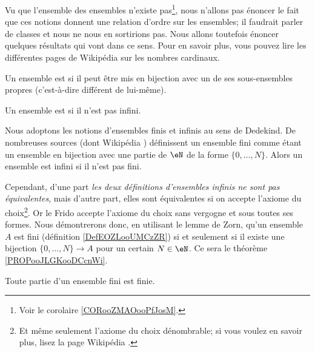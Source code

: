 \begin{normaltext}\label{NORooPasDeClasses}
	Vu que l'ensemble des ensembles n'existe pas\footnote{Voir le corolaire \ref{CORooZMAOooPfJosM}.}, nous n'allons pas énoncer le fait que ces notions donnent une relation d'ordre sur les ensembles; il faudrait parler de classes et nous ne nous en sortirions pas. Nous allons toutefois énoncer quelques résultats qui vont dans ce sens. Pour en savoir plus, vous pouvez lire les différentes pages de Wikipédia sur les nombres cardinaux.
\end{normaltext}

\begin{definition}      \label{DefEOZLooUMCzZR}
	Un ensemble est  si il peut être mis en bijection avec un de ses sous-ensembles propres (c'est-à-dire différent de lui-même).

	Un ensemble est  si il n'est pas infini.
\end{definition}

\begin{normaltext}\label{NORooQuelleDefEnsInfini}
	Nous adoptons les notions d'ensembles finis et infinis au sens de Dedekind. De nombreuses sources (dont Wikipédia \cite{BIBooJYONooLCnCtQ,BIBooPARTooZDteDq}) définissent un ensemble fini comme étant un ensemble en bijection avec une partie de \( \eN\) de la forme \( \{ 0,\ldots, N \}\). Alors un ensemble est infini si il n'est pas fini.

	Cependant, d'une part \emph{les deux définitions d'ensembles infinis ne sont pas équivalentes}, mais d'autre part, elles sont équivalentes si on accepte l'axiome du choix\footnote{Et même seulement l'axiome du choix dénombrable; si vous voulez en savoir plus, lisez la page Wikipédia \cite{BIBooSPDRooHTpBqh}.}. Or le Frido accepte l'axiome du choix sans vergogne et sous toutes ses formes. Nous démontrerons donc, en utilisant le lemme de Zorn, qu'un ensemble \( A\) est fini (définition \ref{DefEOZLooUMCzZR}) si et seulement si il existe une bijection \( \{ 0,\ldots, N \}\to A\) pour un certain \( N\in \eN\). Ce sera le théorème  \ref{PROPooJLGKooDCcnWi}.
\end{normaltext}


\begin{lemma}       \label{LEMooTUIRooEXjfDY}
	Toute partie d'un ensemble fini est finie.
\end{lemma}

